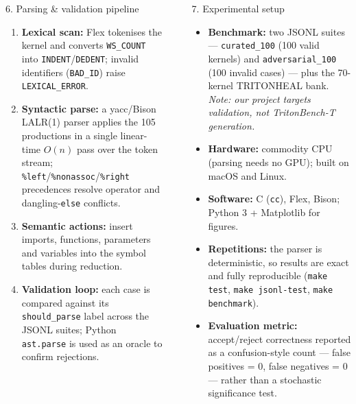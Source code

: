 \documentclass[final]{beamer}
\newlength{\sepwidth}
\newlength{\colwidth}
\newcommand{\separatorcolumn}{\begin{column}{\sepwidth}\end{column}}
\begin{document}
\begin{frame}[t]
\begin{columns}[t]
\begin{column}{\colwidth}
\begin{block}{6. Parsing \& validation pipeline}
    \begin{enumerate}
      \item \textbf{Lexical scan:} Flex tokenises the kernel and converts
        \texttt{WS\_COUNT} into \texttt{INDENT}/\texttt{DEDENT}; invalid
        identifiers (\texttt{BAD\_ID}) raise \texttt{LEXICAL\_ERROR}.
      \item \textbf{Syntactic parse:} a yacc/Bison LALR(1) parser applies the
        105 productions in a single linear-time $O(n)$ pass over the token
        stream; \texttt{\%left}/\texttt{\%nonassoc}/\texttt{\%right}
        precedences resolve operator and dangling-\texttt{else} conflicts.
      \item \textbf{Semantic actions:} insert imports, functions, parameters
        and variables into the symbol tables during reduction.
      \item \textbf{Validation loop:} each case is compared against its
        \texttt{should\_parse} label across the JSONL suites; Python
        \texttt{ast.parse} is used as an oracle to confirm rejections.
    \end{enumerate}

  \end{block}

\end{column}

\separatorcolumn

\begin{column}{\colwidth}

  \begin{exampleblock}{7. Experimental setup}

    \begin{itemize}
      \item \textbf{Benchmark:} two JSONL suites — \texttt{curated\_100}
        (100 valid kernels) and \texttt{adversarial\_100} (100 invalid
        cases) — plus the 70-kernel TRITONHEAL bank. \emph{Note: our project
        targets validation, not TritonBench-T generation.}
      \item \textbf{Hardware:} commodity CPU (parsing needs no GPU); built on
        macOS and Linux.
      \item \textbf{Software:} C (\texttt{cc}), Flex, Bison; Python 3 +
        Matplotlib for figures.
      \item \textbf{Repetitions:} the parser is deterministic, so results are
        exact and fully reproducible (\texttt{make test},
        \texttt{make jsonl-test}, \texttt{make benchmark}).
      \item \textbf{Evaluation metric:} accept/reject correctness reported as
        a confusion-style count — false positives = 0, false negatives = 0
        — rather than a stochastic significance test.
    \end{itemize}


\end{exampleblock}
\end{column}
\end{columns}
\end{frame}
\end{document}
